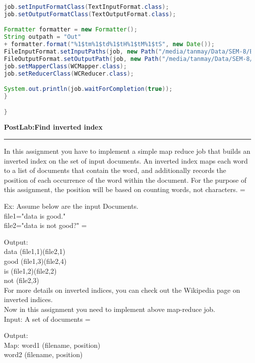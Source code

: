 \documentclass[11pt,article]{memoir}
\begin{document}
\begin{flushleft}
\begin{lstlisting}[language=java]
job.setInputFormatClass(TextInputFormat.class);
job.setOutputFormatClass(TextOutputFormat.class);

Formatter formatter = new Formatter();
String outpath = "Out"
+ formatter.format("%1$tm%1$td%1$tH%1$tM%1$tS", new Date());
FileInputFormat.setInputPaths(job, new Path("/media/tanmay/Data/SEM-8/BDA/EXP2/testfiles"));
FileOutputFormat.setOutputPath(job, new Path("/media/tanmay/Data/SEM-8/BDA/EXP2/output"));
job.setMapperClass(WCMapper.class);
job.setReducerClass(WCReducer.class);

System.out.println(job.waitForCompletion(true));
}

}

\end{lstlisting}
\newpage
\textbf{PostLab:Find inverted index}\hrule
In this assignment you have to implement a simple map reduce job that builds an  inverted index on the set of input documents.  An inverted index maps each word to a list of documents that contain the word, and additionally records the position of each occurrence of the word within the document.  For the purpose of this assignment, the position will be based on counting words, not characters.
\parskip=\baselineskip

  Ex: Assume below are the input Documents.\\

   file1={"data is good."}
	\\
   file2={"data is not good?"}
\parskip=\baselineskip

   Output: \\

                 data {(file1,1)(file2,1)}
\\
                 good {(file1,3)(file2,4)}
\\
                  is  {(file1,2)(file2,2)}
\\
                  not {(file2,3)}
                  \\
For more details on inverted indices, you can check out the Wikipedia page on inverted indices.\\
Now in this assignment you need to implement above map-reduce job.
\\
Input: A set of documents
\parskip=\baselineskip

Output:\\
 Map: word1 (filename, position)\\
 
                    word2 (filename, position)\\
 

\end{flushleft}
\end{document}
